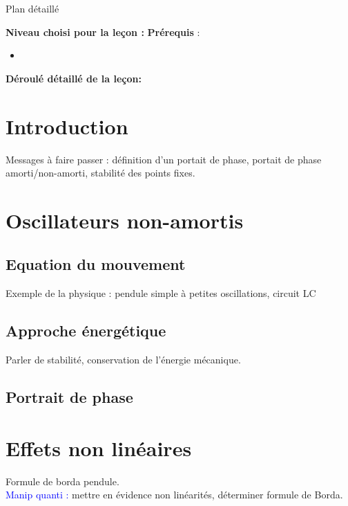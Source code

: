 \begin{reportBlock}{Plan détaillé}

  \textbf{Niveau choisi pour la leçon :} 
  \newline
  \textbf{Prérequis} : \begin{itemize}
      \item 
  \end{itemize}

  \textbf{Déroulé détaillé de la leçon: }  
  
  \section*{Introduction}
Messages à faire passer : définition d'un portait de phase, portait de phase amorti/non-amorti, stabilité des points fixes.
  \section{Oscillateurs non-amortis}
  \subsection{Equation du mouvement}
  Exemple de la physique : pendule simple à petites oscillations, circuit LC
  \subsection{Approche énergétique}
  Parler de stabilité, conservation de l'énergie mécanique.

  \subsection{Portrait de phase}

  \section{Effets non linéaires}
  Formule de borda pendule.\\

  \textcolor{blue}{Manip quanti :} mettre en évidence non linéarités, déterminer formule de Borda.
  


\end{reportBlock}